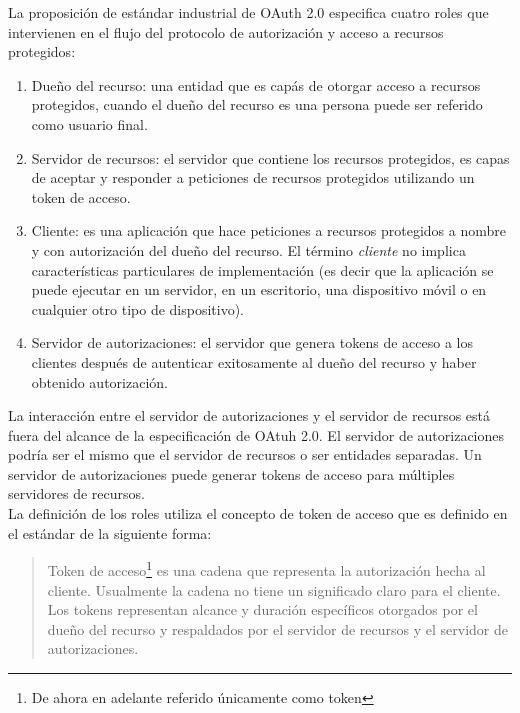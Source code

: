 La proposición de estándar industrial de OAuth 2.0 \cite{OAuthRFC} especifica cuatro roles que intervienen en el flujo del protocolo de autorización y acceso a recursos protegidos:
\begin{enumerate}
	\item Dueño del recurso: una entidad que es capás de otorgar acceso a recursos protegidos, cuando el dueño del recurso es una persona puede ser referido como usuario final.
	\item Servidor de recursos: el servidor que contiene los recursos protegidos, es capas de aceptar y responder a peticiones de recursos protegidos utilizando un token de acceso.
	\item Cliente: es una aplicación que hace peticiones a recursos protegidos a nombre y con autorización del dueño del recurso. El término \textit{cliente} no implica características particulares de implementación (es decir que la aplicación se puede ejecutar en un servidor, en un escritorio, una dispositivo móvil o en cualquier otro tipo de dispositivo).
	\item Servidor de autorizaciones: el servidor que genera tokens de acceso a los clientes después de autenticar exitosamente al dueño del recurso y haber obtenido autorización.
\end{enumerate}
La interacción entre el servidor de autorizaciones y el servidor de recursos está fuera del alcance de la especificación de OAtuh 2.0. El servidor de autorizaciones podría ser el mismo que el servidor de recursos o ser entidades separadas. Un servidor de autorizaciones puede generar tokens de acceso para múltiples servidores de recursos\cite{OAuthRFC}.\\
La definición de los roles utiliza el concepto de token de acceso que es definido en el estándar \cite{OAuthRFC} de la siguiente forma:
\begin{quote}
	Token de acceso\footnote{De ahora en adelante referido únicamente como token} es una cadena que representa la autorización hecha al cliente. Usualmente la cadena no tiene un significado claro para el cliente. Los tokens representan alcance y duración específicos otorgados por el dueño del recurso y respaldados por el servidor de recursos y el servidor de autorizaciones.
\end{quote}

